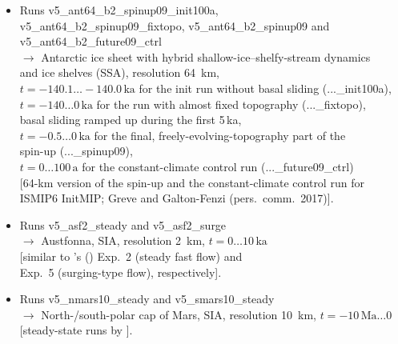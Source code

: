 \documentclass[12pt,a4paper]{article}
\begin{document}
\begin{itemize}
\begin{itemize}
\item
Runs v5\_ant64\_b2\_spinup09\_init100a,
\\
\phantom{Runs} v5\_ant64\_b2\_spinup09\_fixtopo, v5\_ant64\_b2\_spinup09 and
\\
\phantom{Runs} v5\_ant64\_b2\_future09\_ctrl
\\
$\longrightarrow$ Antarctic ice sheet with hybrid shallow-ice--shelfy-stream dynamics
\\
\phantom{$\longrightarrow$} \citep{bernales_etal_2017} and ice shelves (SSA), resolution 64~km,
\\
\phantom{$\longrightarrow$} $t=-140.1\ldots{}-140.0\,\mathrm{ka}$ for the init run without basal sliding (...\_init100a),
\\
\phantom{$\longrightarrow$} $t=-140\ldots{}0\,\mathrm{ka}$ for the run with almost fixed topography (...\_fixtopo),
\\
\hspace*{9.15em} basal sliding ramped up during the first 5\,ka,
\\
\phantom{$\longrightarrow$} $t=-0.5\ldots{}0\,\mathrm{ka}$ for the final, freely-evolving-topography part of the
\\
\hspace*{9.0em} spin-up (...\_spinup09),
\\
\phantom{$\longrightarrow$} $t=0\ldots{}100\,\mathrm{a}$ for the constant-climate control run (...\_future09\_ctrl)
\\{}
\phantom{$\longrightarrow$} [64-km version of the spin-up and the constant-climate control run for 
\\
\phantom{$\longrightarrow$} ISMIP6 InitMIP; Greve and Galton-Fenzi (pers.\ comm.\ 2017)].

\item
Runs v5\_asf2\_steady and v5\_asf2\_surge
\\
$\longrightarrow$ Austfonna, SIA, resolution 2~km, $t=0\ldots{}10\,\mathrm{ka}$
\\
\phantom{$\longrightarrow$} [similar to \citeauthor{dunse_etal_2011}'s (\citeyear{dunse_etal_2011}) Exp.~2 (steady fast flow) and
\\
\phantom{$\longrightarrow$} Exp.~5 (surging-type flow), respectively].

\item
Runs v5\_nmars10\_steady and v5\_smars10\_steady
\\
$\longrightarrow$ North-/south-polar cap of Mars, SIA, resolution 10~km, $t=-10\,\mathrm{Ma}\ldots{}0$
\\
\phantom{$\longrightarrow$} [steady-state runs by \citet{greve_2007b}].


\end{itemize}
\end{itemize}
\end{document}
